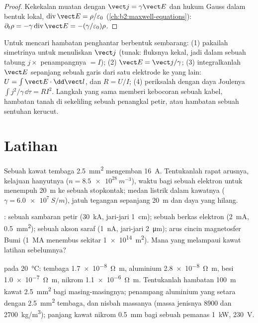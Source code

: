 \begin{proof}
Kekekalan muatan dengan $\vect j = \gamma\vect E$ dan hukum Gauss dalam bentuk
lokal, $\operatorname{div}\vect E = \rho/\varepsilon_0$ (\cref{ch:b2:maxwell-equations}):
$\partial_t\rho = -\gamma\operatorname{div}\vect E = -(\gamma/\varepsilon_0)\rho$.
\end{proof}

\begin{method}\label{met:b2:charges-currents-conduction:method}
Untuk mencari hambatan penghantar berbentuk sembarang: (1) pakailah
simetrinya untuk menuliskan $\vect j$ (tunak: fluksnya kekal, jadi dalam
sebuah tabung $j \times$ penampangnya $= I$); (2) $\vect E = \vect j/\gamma$; (3) integralkanlah
$\vect E$ sepanjang sebuah garis dari satu elektrode ke yang lain: $U = \int\vect E\cdot
\dd\vect l$, dan $R = U/I$; (4) periksalah dengan daya Joulenya $\int j^2/\gamma\,
\dd\tau = RI^2$. Langkah yang sama memberi kebocoran sebuah kabel, hambatan
tanah di sekeliling sebuah penangkal petir, atau hambatan sebuah sentuhan kerucut.
\end{method}

\section{Latihan}

\begin{exercise}[$\star$]\label{exo:b2:charges-currents-conduction:1}
Sebuah kawat tembaga \qty{2.5}{mm^2} mengemban \qty{16}{A}. Tentukanlah rapat arusnya, kelajuan
hanyutnya ($n = \qty{8.5e28}{m^{-3}}$), waktu bagi sebuah elektron untuk menempuh
\qty{20}{m} ke sebuah stopkontak; medan listrik dalam kawatnya ($\gamma = \qty{6.0e7}{S/m}$),
jatuh tegangan sepanjang \qty{20}{m} dan daya yang hilang.
\end{exercise}

\begin{exercise}[$\star$]\label{exo:b2:charges-currents-conduction:2}
: sebuah sambaran petir (\qty{30}{kA}, jari-jari \qty{1}{cm}); sebuah
berkas elektron (\qty{2}{mA}, \qty{0.5}{mm^2}); sebuah akson saraf (\qty{1}{nA}, jari-jari
\qty{2}{\micro m}); arus cincin magnetosfer Bumi (\qty{1}{MA} menembus
sekitar \qty{1e14}{m^2}). Mana yang melampaui kawat latihan sebelumnya?
\end{exercise}

\begin{exercise}[$\star$]\label{exo:b2:charges-currents-conduction:3}
 pada \qty{20}{\degreeCelsius}: tembaga \qty{1.7e-8}{\ohm.m}, aluminium
\qty{2.8e-8}{\ohm.m}, besi \qty{1.0e-7}{\ohm.m}, nikrom \qty{1.1e-6}{\ohm.m}.
Tentukanlah hambatan \qty{100}{m} kawat \qty{2.5}{mm^2} bagi masing-masingnya; penampang aluminium
yang setara dengan \qty{2.5}{mm^2} tembaga, dan nisbah massanya (massa jenisnya
$8900$ dan \qty{2700}{kg/m^3}); panjang kawat nikrom \qty{0.5}{mm} bagi sebuah
pemanas \qty{1}{kW}, \qty{230}{V}.
\end{exercise}

